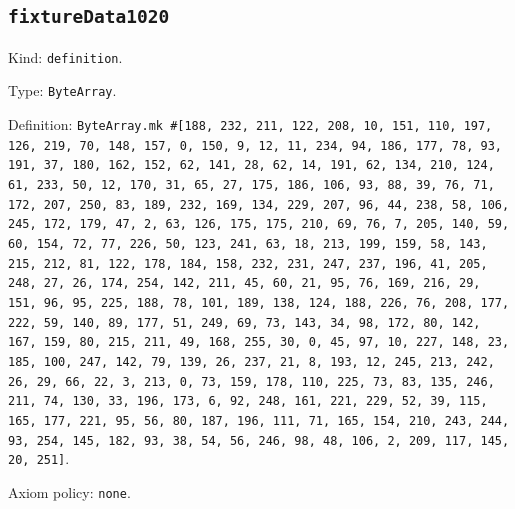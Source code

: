 \documentclass[11pt]{article}
\begin{document}
\subsection*{\texttt{fixtureData1020}}
\noindent Kind: \texttt{definition}.\par
\noindent Type: \texttt{ByteArray}.\par
\noindent Definition: \texttt{ByteArray.mk \#[188, 232, 211, 122, 208, 10, 151, 110, 197, 126, 219, 70, 148, 157, 0, 150, 9, 12, 11, 234, 94, 186, 177, 78, 93, 191, 37, 180, 162, 152, 62, 141, 28, 62, 14, 191, 62, 134, 210, 124, 61, 233, 50, 12, 170, 31, 65, 27, 175, 186, 106, 93, 88, 39, 76, 71, 172, 207, 250, 83, 189, 232, 169, 134, 229, 207, 96, 44, 238, 58, 106, 245, 172, 179, 47, 2, 63, 126, 175, 175, 210, 69, 76, 7, 205, 140, 59, 60, 154, 72, 77, 226, 50, 123, 241, 63, 18, 213, 199, 159, 58, 143, 215, 212, 81, 122, 178, 184, 158, 232, 231, 247, 237, 196, 41, 205, 248, 27, 26, 174, 254, 142, 211, 45, 60, 21, 95, 76, 169, 216, 29, 151, 96, 95, 225, 188, 78, 101, 189, 138, 124, 188, 226, 76, 208, 177, 222, 59, 140, 89, 177, 51, 249, 69, 73, 143, 34, 98, 172, 80, 142, 167, 159, 80, 215, 211, 49, 168, 255, 30, 0, 45, 97, 10, 227, 148, 23, 185, 100, 247, 142, 79, 139, 26, 237, 21, 8, 193, 12, 245, 213, 242, 26, 29, 66, 22, 3, 213, 0, 73, 159, 178, 110, 225, 73, 83, 135, 246, 211, 74, 130, 33, 196, 173, 6, 92, 248, 161, 221, 229, 52, 39, 115, 165, 177, 221, 95, 56, 80, 187, 196, 111, 71, 165, 154, 210, 243, 244, 93, 254, 145, 182, 93, 38, 54, 56, 246, 98, 48, 106, 2, 209, 117, 145, 20, 251]}.\par
\noindent Axiom policy: \texttt{none}.\par
\end{document}
